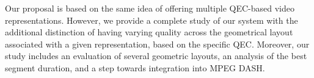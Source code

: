 Our proposal is based on the same
idea of offering multiple \ac{QEC}-based video representations.
However, we provide a complete study of our system with the additional
distinction of having varying quality across the geometrical layout
associated with a given representation, based on the specific
\ac{QEC}. Moreover, our study includes an evaluation of several
geometric layouts, an analysis of the best segment duration,  
and a step towards integration into MPEG \ac{DASH}.
